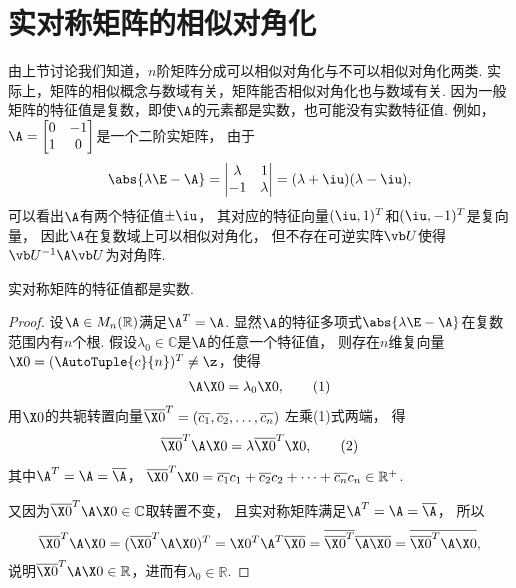 \section{实对称矩阵的相似对角化}
由上节讨论我们知道，\(n\)阶矩阵分成可以相似对角化与不可以相似对角化两类.
实际上，矩阵的相似概念与数域有关，矩阵能否相似对角化也与数域有关.
因为一般矩阵的特征值是复数，即使\(\A\)的元素都是实数，也可能没有实数特征值.
例如，\(\A = \begin{bmatrix} 0 & -1 \\ 1 & 0 \end{bmatrix}\)是一个二阶实矩阵，
由于\[
	\abs{\lambda\E-\A}
	= \begin{vmatrix}
		\lambda & 1 \\
		-1 & \lambda
	\end{vmatrix}
	= (\lambda+\iu)(\lambda-\iu),
\]
可以看出\(\A\)有两个特征值\(\pm\iu\)，
其对应的特征向量\((\iu,1)^T\)和\((\iu,-1)^T\)是复向量，
因此\(\A\)在复数域上可以相似对角化，
但不存在可逆实阵\(\P\)使得\(\P^{-1}\A\P\)为对角阵.

\begin{theorem}\label{theorem:特征值与特征向量.实对称矩阵1}
实对称矩阵的特征值都是实数.
\begin{proof}
设\(\A \in M_n(\mathbb{R})\)满足\(\A^T=\A\).
显然\(\A\)的特征多项式\(\abs{\lambda\E-\A}\)在复数范围内有\(n\)个根.
假设\(\lambda_0\in\mathbb{C}\)是\(\A\)的任意一个特征值，
则存在\(n\)维复向量\(\X0=(\AutoTuple{c}{n})^T \neq \z\)，使得
\begin{gather}
	\A\X0 = \lambda_0 \X0, \tag1
\end{gather}
用\(\X0\)的共轭转置向量\(\overline{\X0}^T
=(\overline{c_1},\overline{c_2},\dotsc,\overline{c_n})\)
左乘(1)式两端，
得\begin{gather}
	\overline{\X0}^T \A \X0 = \lambda \overline{\X0}^T \X0, \tag2
\end{gather}
其中\(\A^T=\A=\overline{\A}\)，
\(\overline{\X0}^T \X0
= \overline{c_1}c_1 + \overline{c_2}c_2 + \dotsb + \overline{c_n}{c_n} \in \mathbb{R}^+\).

又因为\(\overline{\X0}^T \A \X0 \in \mathbb{C}\)取转置不变，
且实对称矩阵满足\(\A^T = \A = \overline{\A}\)，
所以\[
	\overline{\X0}^T \A \X0
	= (\overline{\X0}^T \A \X0)^T
	= \X0^T \A^T \overline{\X0}
	= \overline{\overline{\X0}^T} \overline{\A} \overline{\X0}
	= \overline{\overline{\X0}^T \A \X0},
\]
说明\(\overline{\X0}^T \A \X0 \in \mathbb{R}\)，进而有\(\lambda_0 \in \mathbb{R}\).
\end{proof}
\end{theorem}

